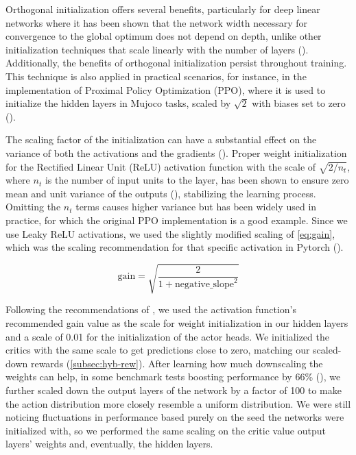 \bigskip

\noindent Orthogonal initialization offers several benefits, particularly for deep linear networks where it has been shown that the network width necessary for convergence to the global optimum does not depend on depth, unlike other initialization techniques that scale linearly with the number of layers (\cite{hu2020provable}). Additionally, the benefits of orthogonal initialization persist throughout training. This technique is also applied in practical scenarios, for instance, in the implementation of Proximal Policy Optimization (PPO), where it is used to initialize the hidden layers in Mujoco tasks, scaled by $\sqrt{2}$ with biases set to zero (\cite{shengyi2022the37implementation}).

\bigskip

\noindent The scaling factor of the initialization can have a substantial effect on the variance of both the activations and the gradients (\cite{pmlr-v9-glorot10a}). Proper weight initialization for the Rectified Linear Unit (ReLU) activation function with the scale of $\sqrt{2/n_t}$, where $n_t$ is the number of input units to the layer, has been shown to ensure zero mean and unit variance of the outputs (\cite{DBLP:journals/corr/HeZR015}), stabilizing the learning process. Omitting the $n_t$ terms causes higher variance but has been widely used in practice, for which the original PPO implementation is a good example. Since we use Leaky ReLU activations, we used the slightly modified scaling of \autoref{eq:gain}, which was the scaling recommendation for that specific activation in Pytorch (\cite{pytorchinit}).

\begin{equation}
    \text{gain} = \sqrt{\frac{2}{1+\text{negative\_slope}^2}}
\label{eq:gain}
\end{equation}

\bigskip

\noindent Following the recommendations of \cite{shengyi2022the37implementation}, we used the activation function's recommended gain value as the scale for weight initialization in our hidden layers and a scale of 0.01 for the initialization of the actor heads. We initialized the critics with the same scale to get predictions close to zero, matching our scaled-down rewards (\autoref{subsec:hyb-rew}). After learning how much downscaling the weights can help, in some benchmark tests boosting performance by 66\% (\cite{andrychowicz2020matters}), we further scaled down the output layers of the network by a factor of 100 to make the action distribution more closely resemble a uniform distribution. We were still noticing fluctuations in performance based purely on the seed the networks were initialized with, so we performed the same scaling on the critic value output layers' weights and, eventually, the hidden layers.

